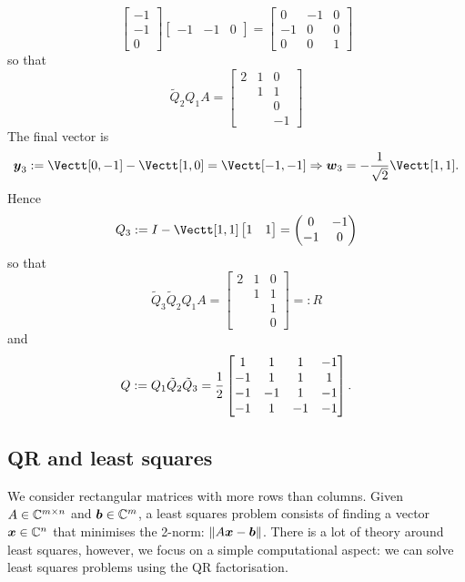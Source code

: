 \begin{example}[QR by hand]
\[ \begin{bmatrix} -1 \\ -1 \\ 0
\end{bmatrix} \begin{bmatrix} -1 & -1 & 0 \end{bmatrix}
= \begin{bmatrix}
0 & -1 & 0 \\
-1& 0 & 0 \\
0 & 0 & 1
\end{bmatrix}
\]
so that
\[
\tilde Q_2 Q_1 A = \begin{bmatrix} 2 & 1 & 0 \\
 & 1 & 1 \\
  &  & 0 \\
&  & -1
\end{bmatrix}
\]
The final vector is 
\[
\ensuremath{\bm{\y}}_3 := \Vectt[0,-1] - \Vectt[1,0] = \Vectt[-1,-1] \ensuremath{\Rightarrow} \ensuremath{\bm{\w}}_3 = -{1 \over \sqrt{2}} \Vectt[1,1].
\]
Hence
\[
Q_3 := I - \Vectt[1,1] \begin{bmatrix} 1 & 1 \end{bmatrix} = \sopmatrix{0 & - 1 \\ -1 & 0}
\]
so that 
\[
\tilde Q_3 \tilde Q_2 Q_1 A = \begin{bmatrix} 2 & 1 & 0 \\
 & 1 & 1 \\
  &  & 1 \\
&  & 0
\end{bmatrix} =: R
\]
and
\[
Q := Q_1 \tilde Q_2 \tilde Q_3 = {1 \over 2}  \begin{bmatrix}
1 & 1 & 1 & -1 \\
-1 & 1 & 1 & 1 \\
-1 & -1 & 1 & -1 \\
-1 & 1 & -1 & -1
\end{bmatrix}.
\]
\subsection{QR and least squares}
We consider rectangular matrices with more rows than columns. Given $A \in {\mathbb C}^{m \times n}$ and $\bm{{\mbox{\boldmath$b$\unboldmath}}} \in {\mathbb C}^m$, a least squares problem consists of finding a vector $\bm{{\mbox{\boldmath$x$\unboldmath}}} \in {\mathbb C}^n$ that minimises the 2-norm: $\| A \bm{{\mbox{\boldmath$x$\unboldmath}}} - \bm{{\mbox{\boldmath$b$\unboldmath}}} \|$. There is a lot of theory around least squares, however, we focus on a simple computational aspect: we can solve least squares problems using the QR factorisation.


\end{example}
